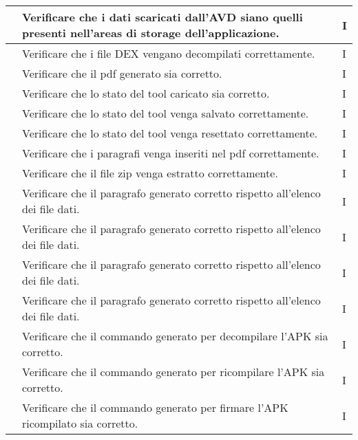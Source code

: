 \begin{center}
\begin{longtable}{ |C{3cm} | C{8.5cm}| C{1.5cm} |}
         & Verificare che i dati scaricati dall'AVD siano quelli presenti nell'areas di storage dell'applicazione. & I \\\hline
         & Verificare che i file DEX vengano decompilati correttamente.                                            & I \\\hline
         & Verificare che il pdf generato sia corretto.                                                            & I \\\hline
         & Verificare che lo stato del tool caricato sia corretto.                                                 & I \\\hline
         & Verificare che lo stato del tool venga salvato correttamente.                                           & I \\\hline
         & Verificare che lo stato del tool venga resettato correttamente.                                         & I \\\hline
         & Verificare che i paragrafi venga inseriti nel pdf correttamente.                                        & I \\\hline
         & Verificare che il file zip venga estratto correttamente.                                                & I \\\hline
         & Verificare che il paragrafo generato corretto rispetto all'elenco dei file dati.                        & I \\\hline
         & Verificare che il paragrafo generato corretto rispetto all'elenco dei file dati.                        & I \\\hline
         & Verificare che il paragrafo generato corretto rispetto all'elenco dei file dati.                        & I \\\hline
         & Verificare che il paragrafo generato corretto rispetto all'elenco dei file dati.                        & I \\\hline
         & Verificare che il commando generato per decompilare l'APK sia corretto.                                 & I \\\hline
         & Verificare che il commando generato per ricompilare l'APK sia corretto.                                 & I \\\hline
         & Verificare che il commando generato per firmare l'APK ricompilato sia corretto.                         & I \\\hline

\end{longtable}
\end{center}
